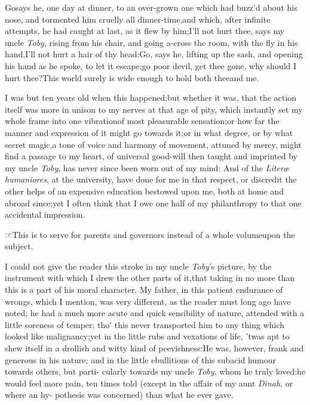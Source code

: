 \documentclass{article}
\begin{document}
\newpage
\tsk Go\tsk says he, one day at dinner, to an over-grown one
which had buzz’d about his nose, and tormented him cruelly all
dinner-time,\tsk and which, after infinite attempts, he had caught
at last, as it flew by him;\tsk I’ll not hurt thee,
says my uncle \textit{Toby}, rising from his chair, and
going a-cross
the room, with the fly in his hand,\tsk I’ll not hurt a
hair of thy head:\tsk Go, says he, lifting up the sash, and
opening his hand as he spoke, to let it escape;\tsk go poor
devil, get thee gone, why should I hurt thee?\tsh This
world surely is wide enough to hold both thee\break and me.

I was but ten years old when this happened;\tsk but whether it was,
that the action itself was more in unison to my nerves at that age
of pity, which instantly set my whole frame into one
vibration\pb of
most pleasurable sensation;\tsk or how far the manner and
expression of it might go towards it;\tsk or in what degree, or
by what secret magic,\tsk a tone of voice and harmony of
movement, attuned by mercy, might find a passage to my heart,
of universal good-will
then taught and imprinted by my uncle \textit{Toby}, has never since
been worn out of my mind: And 
of the \textit{Literæ humaniores}, at the university,
have done for me in that
respect, or discredit the other helps of an expensive education
bestowed upon me, both at home and abroad since;\tsk yet I often
think that I owe one half of my philanthropy to that one accidental
impression.

☞\quad This is to serve for parents and governors instead of a whole
volume\break upon the subject.

I could not give the reader this stroke in my uncle
\textit{Toby}’s picture, by the instrument with which I drew
the other parts of it,\tsh that taking in no more than
\break\tsh this
is a part of his moral character. My father, in this patient
endurance of wrongs, which I mention, was very different, as the
reader must long ago have noted; he had a much more acute and quick
sensibility of nature, attended with a little soreness of temper;
tho’ this ne\-ver transported him to any thing which looked
like malignancy;\tsh yet in the little rubs and vexations of
life, ’twas apt to shew itself in a drollish and witty kind of
peevishness:\tsh He was, however, frank and generous in
his nature;\break
{}
and in the little ebullitions of this sub\-acid humour towards others, but
parti-\pb
cularly towards my uncle \textit{Toby}, whom he truly
loved:\tsh he would feel more pain, ten times told (except
in the affair of my aunt \textit{Dinah}, or where an
hy-\break 
pothesis was concerned) than what he ever gave.
\end{document}
